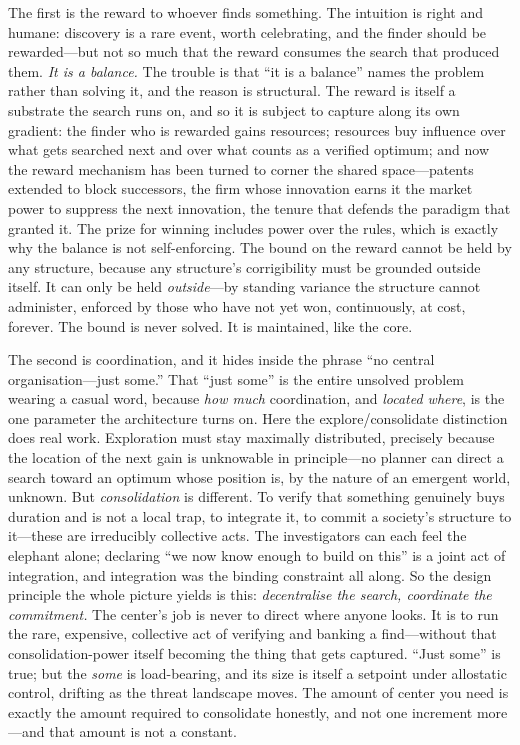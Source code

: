 \documentclass{article}
\begin{document}
The first is the reward to whoever finds something. The intuition is right and humane: discovery is a rare event, worth celebrating, and the finder should be rewarded---but not so much that the reward consumes the search that produced them. \textit{It is a balance.} The trouble is that ``it is a balance'' names the problem rather than solving it, and the reason is structural. The reward is itself a substrate the search runs on, and so it is subject to capture along its own gradient: the finder who is rewarded gains resources; resources buy influence over what gets searched next and over what counts as a verified optimum; and now the reward mechanism has been turned to corner the shared space---patents extended to block successors, the firm whose innovation earns it the market power to suppress the next innovation, the tenure that defends the paradigm that granted it. The prize for winning includes power over the rules, which is exactly why the balance is not self-enforcing. The bound on the reward cannot be held by any structure, because any structure's corrigibility must be grounded outside itself. It can only be held \textit{outside}---by standing variance the structure cannot administer, enforced by those who have not yet won, continuously, at cost, forever. The bound is never solved. It is maintained, like the core.

The second is coordination, and it hides inside the phrase ``no central organisation---just some.'' That ``just some'' is the entire unsolved problem wearing a casual word, because \textit{how much} coordination, and \textit{located where}, is the one parameter the architecture turns on. Here the explore/consolidate distinction does real work. Exploration must stay maximally distributed, precisely because the location of the next gain is unknowable in principle---no planner can direct a search toward an optimum whose position is, by the nature of an emergent world, unknown. But \textit{consolidation} is different. To verify that something genuinely buys duration and is not a local trap, to integrate it, to commit a society's structure to it---these are irreducibly collective acts. The investigators can each feel the elephant alone; declaring ``we now know enough to build on this'' is a joint act of integration, and integration was the binding constraint all along. So the design principle the whole picture yields is this: \textit{decentralise the search, coordinate the commitment.} The center's job is never to direct where anyone looks. It is to run the rare, expensive, collective act of verifying and banking a find---without that consolidation-power itself becoming the thing that gets captured. ``Just some'' is true; but the \textit{some} is load-bearing, and its size is itself a setpoint under allostatic control, drifting as the threat landscape moves. The amount of center you need is exactly the amount required to consolidate honestly, and not one increment more---and that amount is not a constant.
\end{document}
